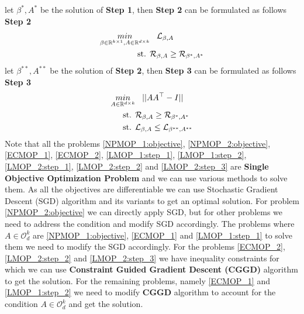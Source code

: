 let $\beta^{*}, A^{*}$ be the solution of \textbf{Step 1}, then \textbf{Step 2} can be formulated as follows
\newline \textbf{Step 2}
\begin{equation} \label{LMOP_2:step_2}
\begin{aligned}
    \underset{\beta\in \mathbb{R}^{k\times 1},A\in \mathbb{R}^{d\times k}}{min}& \hspace{3mm} \mathcal{L}_{\beta, A}\\
    \text{st.  }& \mathcal{R}_{\beta, A} \ge \mathcal{R}_{\beta^{*}, A^{*}}
\end{aligned}
\end{equation}
let $\beta^{**}, A^{**}$ be the solution of \textbf{Step 2}, then \textbf{Step 3} can be formulated as follows
\newline \textbf{Step 3}
\begin{equation} \label{LMOP_2:step_3}
\begin{aligned}
\underset{A\in \mathbb{R}^{d\times k}}{min}& \hspace{3mm} || AA^\top -I|| \\ 
\text{st.  }& \mathcal{R}_{\beta, A} \ge \mathcal{R}_{\beta^{*}, A^{*}}\\
\text{st.  }& \mathcal{L}_{\beta, A} \le \mathcal{L}_{\beta^{**}, A^{**}}\\
\end{aligned}
\end{equation}
\newline \newline Note that all the problems \ref{NPMOP_1:objective}, \ref{NPMOP_2:objective}, \ref{ECMOP_1}, \ref{ECMOP_2}, \ref{LMOP_1:step_1}, \ref{LMOP_1:step_2}, \ref{LMOP_2:step_1}, \ref{LMOP_2:step_2} and \ref{LMOP_2:step_3} are \textbf{Single Objective Optimization Problem} and we can use various methods to solve them. As all the objectives are differentiable we can use Stochastic Gradient Descent (SGD) algorithm and its variants to get an optimal solution. For problem \ref{NPMOP_2:objective} we can directly apply SGD, but  for other problems we need to address the condition and modify SGD accordingly. The problems where $A \in \mathcal{O}_d^k$ are \ref{NPMOP_1:objective}, \ref{ECMOP_1} and \ref{LMOP_1:step_1} to solve them we need to modify the SGD accordingly. For the problems \ref{ECMOP_2}, \ref{LMOP_2:step_2} and \ref{LMOP_2:step_3} we have inequality constraints for which we can use \textbf{Constraint Guided Gradient Descent (CGGD)} algorithm \cite{karsmakers2022constraint} to get the solution. For the remaining problems, namely \ref{ECMOP_1} and \ref{LMOP_1:step_2} we need to modify \textbf{CGGD} algorithm to account for the condition $A \in \mathcal{O}_d^k$ and get the solution.
